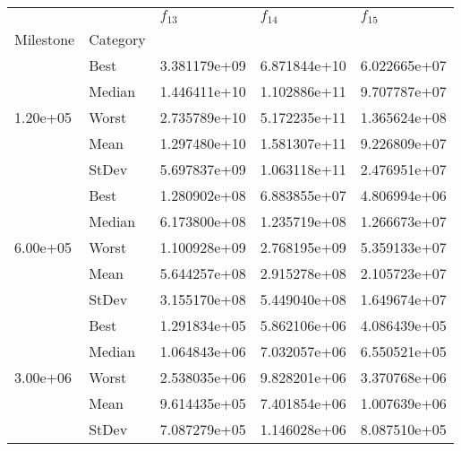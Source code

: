 \begin{tabular}{lllll}
\toprule
         &      &     $f_{13}$ &     $f_{14}$ &     $f_{15}$ \\
Milestone & Category &              &              &              \\
\midrule
\multirow{5}{*}{1.20e+05} & Best & 3.381179e+09 & 6.871844e+10 & 6.022665e+07 \\
         & Median & 1.446411e+10 & 1.102886e+11 & 9.707787e+07 \\
         & Worst & 2.735789e+10 & 5.172235e+11 & 1.365624e+08 \\
         & Mean & 1.297480e+10 & 1.581307e+11 & 9.226809e+07 \\
         & StDev & 5.697837e+09 & 1.063118e+11 & 2.476951e+07 \\
\cline{1-5}
\multirow{5}{*}{6.00e+05} & Best & 1.280902e+08 & 6.883855e+07 & 4.806994e+06 \\
         & Median & 6.173800e+08 & 1.235719e+08 & 1.266673e+07 \\
         & Worst & 1.100928e+09 & 2.768195e+09 & 5.359133e+07 \\
         & Mean & 5.644257e+08 & 2.915278e+08 & 2.105723e+07 \\
         & StDev & 3.155170e+08 & 5.449040e+08 & 1.649674e+07 \\
\cline{1-5}
\multirow{5}{*}{3.00e+06} & Best & 1.291834e+05 & 5.862106e+06 & 4.086439e+05 \\
         & Median & 1.064843e+06 & 7.032057e+06 & 6.550521e+05 \\
         & Worst & 2.538035e+06 & 9.828201e+06 & 3.370768e+06 \\
         & Mean & 9.614435e+05 & 7.401854e+06 & 1.007639e+06 \\
         & StDev & 7.087279e+05 & 1.146028e+06 & 8.087510e+05 \\
\bottomrule
\end{tabular}
